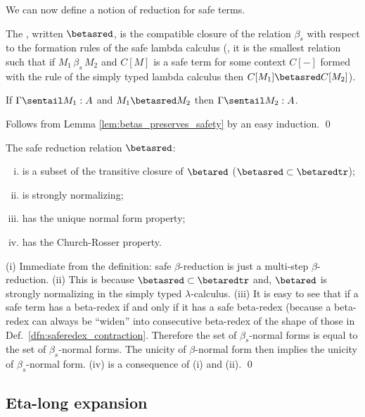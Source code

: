 We can now define a notion of reduction for safe terms.
\begin{definition}\rm
The , written $\betasred$, is the
compatible closure of the relation $\beta_s$ with respect to the
formation rules of the safe lambda calculus (\ie, it is the smallest relation such that
if $M_1\, \beta_s\, M_2$ and $C[M]$ is a safe term for some context $C[-]$ formed with the rule of the simply typed lambda calculus then $C[M_1]\betasred C[M_2]$).
\end{definition}

\begin{lemma}
\label{lem:safered_preserves_safety}
If $\Gamma \sentail M_1 :A$ and $M_1\betasred M_2$ then $\Gamma \sentail M_2 :A$.
\end{lemma}
\proof
Follows from Lemma \ref{lem:betas_preserves_safety} by an easy induction.
\qed


\begin{lemma} The safe reduction relation $\betasred$:
\begin{enumerate}[(i)]
\item is a subset of the transitive closure of $\betared$ ($\betasred \subset \betaredtr$);
\item is strongly normalizing;
\item has the unique normal form property;
\item has the Church-Rosser property.
\end{enumerate}
\end{lemma}
\proof
(i) Immediate from the definition: safe $\beta$-reduction is just a multi-step $\beta$-reduction.
(ii) This is because $\betasred \subset \betaredtr$ and, $\betared$ is
strongly normalizing in the simply typed $\lambda$-calculus. (iii) It is easy to see that if a safe term has a beta-redex if and only if it has a safe beta-redex (because a beta-redex can always be ``widen'' into consecutive beta-redex of the shape of those in Def.~\ref{dfn:saferedex_contraction}. Therefore the set
of $\beta_s$-normal forms is equal to the set of $\beta_s$-normal
forms. The unicity of $\beta$-normal form then implies the unicity
of $\beta_s$-normal form. (iv) is a consequence of (i) and (ii).
\qed

\subsection*{Eta-long expansion}

